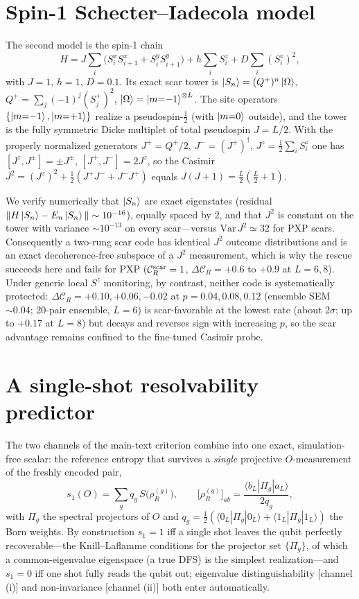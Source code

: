 \documentclass[aps,prxquantum,twocolumn,superscriptaddress,floatfix,longbibliography]{revtex4-2}
\newcommand{\CR}{\mathcal{C}_R}
\begin{document}
\section{Spin-1 Schecter--Iadecola model}

The second model is the spin-1 chain
\begin{equation}
H = J\sum_i\!\big(S^x_iS^x_{i+1}+S^y_iS^y_{i+1}\big)
   + h\sum_i S^z_i + D\sum_i (S^z_i)^2,
\end{equation}
with $J{=}1$, $h{=}1$, $D{=}0.1$. Its exact scar tower is
$\ket{S_n}=(Q^+)^n\ket{\Omega}$, $Q^+=\sum_j(-1)^j(S^+_j)^2$,
$\ket{\Omega}=\ket{m{=}{-}1}^{\otimes L}$. The site operators
$\{\ket{m{=}{-}1},\ket{m{=}{+}1}\}$ realize a pseudospin-$\tfrac12$ (with
$\ket{m{=}0}$ outside), and the tower is the fully symmetric Dicke multiplet of
total pseudospin $J=L/2$. With the properly normalized generators
$J^+=Q^+/2$, $J^-=(J^+)^\dagger$, $J^z=\tfrac12\sum_iS^z_i$ one has
$[J^z,J^\pm]=\pm J^\pm$, $[J^+,J^-]=2J^z$, so the Casimir
$J^2=(J^z)^2+\tfrac12(J^+J^-+J^-J^+)$ equals $J(J{+}1)=\tfrac{L}{2}(\tfrac{L}{2}{+}1)$.

We verify numerically that $\ket{S_n}$ are exact eigenstates (residual
$\|H\ket{S_n}-E_n\ket{S_n}\|\sim10^{-16}$), equally spaced by $2$, and that $J^2$
is constant on the tower with variance $\sim10^{-13}$ on every scar---versus
$\mathrm{Var}\,J^2\simeq32$ for PXP scars. Consequently a two-rung scar code has
identical $J^2$ outcome distributions and is an exact decoherence-free subspace
of a $J^2$ measurement, which is why the rescue succeeds here and fails for PXP
($\CR^{\rm scar}=1$, $\Delta\CR=+0.6$ to $+0.9$ at $L=6,8$). Under generic local
$S^z$ monitoring, by contrast, neither code is systematically protected:
$\Delta\CR=+0.10,+0.06,-0.02$ at $p=0.04,0.08,0.12$ (ensemble SEM $\sim0.04$;
$20$-pair ensemble, $L=6$) is scar-favorable at the lowest rate (about
$2\sigma$; up to $+0.17$ at $L=8$) but decays and reverses sign with increasing
$p$, so the scar advantage remains confined to the fine-tuned Casimir probe.

\section{A single-shot resolvability predictor}

The two channels of the main-text criterion combine into one exact,
simulation-free scalar: the reference entropy that survives a \emph{single}
projective $O$-measurement of the freshly encoded pair,
\begin{equation}
s_1(O)=\sum_g q_g\, S\!\big(\rho_R^{(g)}\big),\qquad
\big[\rho_R^{(g)}\big]_{ab} = \frac{\langle b_L|\Pi_g|a_L\rangle}{2q_g},
\end{equation}
with $\Pi_g$ the spectral projectors of $O$ and $q_g=\tfrac12(\langle
0_L|\Pi_g|0_L\rangle+\langle1_L|\Pi_g|1_L\rangle)$ the Born weights. By
construction $s_1=1$ iff a single shot leaves the qubit perfectly
recoverable---the Knill--Laflamme conditions for the projector set
$\{\Pi_g\}$, of which a common-eigenvalue eigenspace (a true DFS) is the
simplest realization---and $s_1=0$ iff one shot fully reads the qubit out;
eigenvalue distinguishability [channel (i)] and non-invariance [channel (ii)]
both enter automatically.
\end{document}
